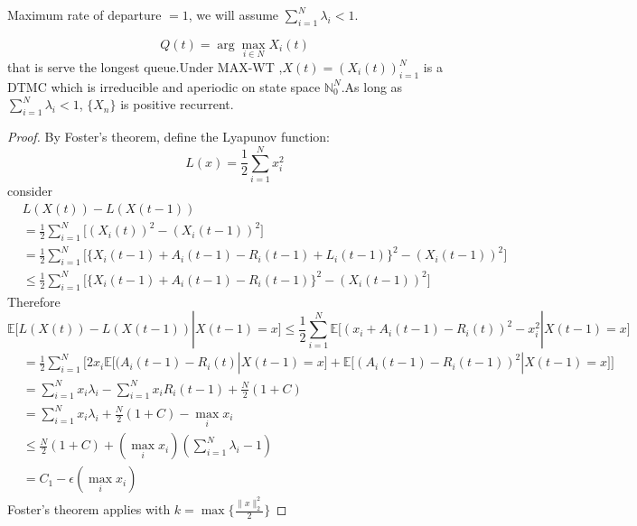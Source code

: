 \documentclass[a4paper,10pt,english]{article}
\begin{document}
Maximum rate of departure $= 1$, we will assume $ \sum_{i=1}^{N} \lambda _i < 1$.
\begin{thm}
\[Q(t) = \arg \max _{i \in N} X_i(t)  \] 
that is serve  the longest queue.Under MAX-WT ,$X(t) = (X_i(t))_{i=1}^{N}$ is a DTMC which is irreducible and aperiodic on state space $\mathbb{N}_0^N$.As long as $\sum_{i=1}^{N} \lambda _i < 1$, $\{X_n\}$ is positive recurrent.
\end{thm}
\begin{proof}
By Foster's theorem, define the Lyapunov function:
\[L(x) = \frac{1}{2} \sum_{i=1}^{N}x_i^2\] consider
\begin{align*}
& L(X(t)) - L(X(t-1))\\
&= \frac{1}{2} \sum_{i=1}^{N}\Big[ (X_i(t))^2 - (X_i(t-1))^2 \Big]\\
&= \frac{1}{2} \sum_{i=1}^{N}\Big[ \{X_i(t-1) + A_i(t-1) - R_i(t-1) + L_i(t-1)\}^2 - (X_i(t-1))^2 \Big]\\
& \leq \frac{1}{2} \sum_{i=1}^{N}\Big[ \{X_i(t-1) + A_i(t-1) - R_i(t-1)\}^2 - (X_i(t-1))^2 \Big]
\end{align*}
Therefore 
\[\mathbb{E}\Big[ L(X(t)) - L(X(t-1)) | X(t-1) = x \Big]  \leq \frac{1}{2} \sum_{i=1}^{N} \mathbb{E} \Big[ (x_i + A_i(t-1) - R_i(t))^2 - x_i^2 | X(t-1) = x \Big]\]
\begin{align*}
&= \frac{1}{2} \sum_{i=1}^{N} \Bigg[ 2x_i \mathbb{E} \Big[ (A_i(t-1) - R_i(t)| X(t-1) = x \Big] + \mathbb{E} \Big[ (A_i(t-1) - R_i(t-1))^2 | X(t-1) = x \Big] \Bigg]\\
&= \sum_{i=1}^{N}x_i \lambda _i - \sum_{i=1}^{N}x_i R_i(t-1) + \frac{N}{2}(1+C)\\
&= \sum_{i=1}^{N}x_i \lambda _i + \frac{N}{2}(1+C) - \max _i x_i\\
& \leq \frac{N}{2}(1+C) + (\max _i x_i)(\sum_{i=1}^{N} \lambda _i - 1)\\
&= C_1 - \epsilon (\max _i x_i)
\end{align*}
Foster's theorem applies with $k = \max \{\frac{\|x\|_2 ^2}{2}\}$
\end{proof}
\end{document}
